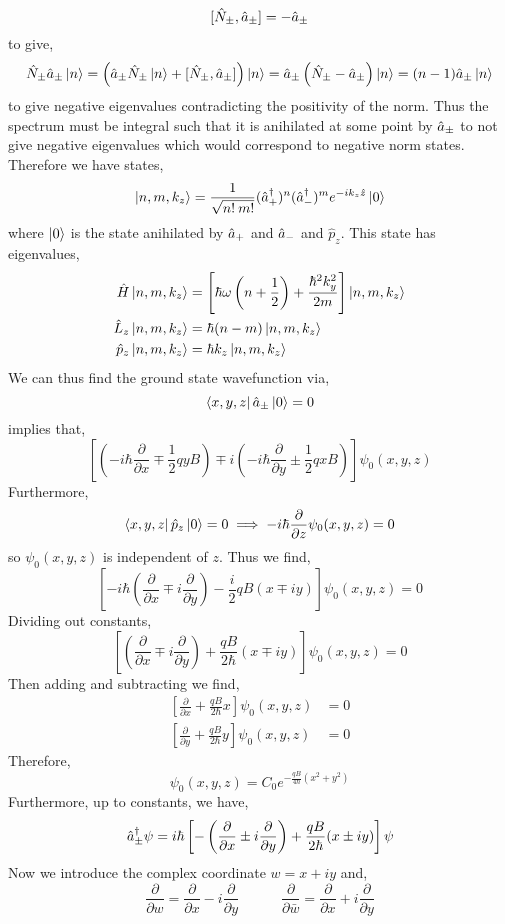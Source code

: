 \documentclass[12pt]{extarticle}
\newcommand{\pderiv}[2]{\frac{\partial{#1}}{\partial{#2}}}
\theoremstyle{definition}
\begin{document}
\[ [\hat{N}_{\pm}, \hat{a}_{\pm}] = - \hat{a}_{\pm} \]
to give,
\[ \hat{N}_{\pm} \hat{a}_{\pm} \left| n \right> = \left( \hat{a}_{\pm} \hat{N}_{\pm} \left| n \right> + [\hat{N}_{\pm}, \hat{a}_{\pm}] \right) \left| n \right> = \hat{a}_{\pm} \left( \hat{N}_{\pm}  - \hat{a}_{\pm} \right) \left| n \right> = (n - 1) \hat{a}_{\pm} \left| n \right> \]
to give negative eigenvalues contradicting the positivity of the norm. Thus the spectrum must be integral such that it is anihilated at some point by $\hat{a}_{\pm}$ to not give negative eigenvalues which would correspond to negative norm states. Therefore we have states,
\[ \left| n, m, k_z \right> = \frac{1}{\sqrt{n! \: m!}} (\hat{a}^\dagger_{+})^n (\hat{a}^\dagger_{-})^m e^{- i k_z \hat{z}} \left| 0 \right> \]
where $\left| 0 \right>$ is the state anihilated by $\hat{a}_{+}$ and $\hat{a}_{-}$ and $\hat{p}_z$. This state has eigenvalues,
\begin{align*}
\hat{H} \left| n, m, k_z \right> & = \left[ \hbar \omega \left( n + \frac{1}{2} \right) + \frac{\hbar^2 k_y^2}{2m} \right] \left| n, m, k_z \right>
\\
\hat{L}_z \left| n, m, k_z \right> & = \hbar (n - m) \left| n, m, k_z \right>
\\
\hat{p}_z \left| n, m, k_z \right> & = \hbar k_z \left| n, m, k_z \right>
\end{align*}
We can thus find the ground state wavefunction via,
\[ \left< x,y,z \right| \hat{a}_{\pm} \left| 0 \right> = 0 \]
implies that,
\[ \left[ \left( - i \hbar \pderiv{}{x} \mp \frac{1}{2} q y B \right) \mp i \left( - i \hbar \pderiv{}{y} \pm \frac{1}{2} q x B \right) \right] \psi_0(x, y, z) \]
Furthermore,
\[ \bra{x,y,z} \hat{p}_z \ket{0} = 0 \implies - i \hbar \pderiv{}{z} \psi_0(x,y,z) = 0 \]
so $\psi_0(x, y, z)$ is independent of $z$. Thus we find,
\[ \left[ - i \hbar \left( \pderiv{}{x} \mp i \pderiv{}{y} \right) - \frac{i}{2} q B ( x \mp i y ) \right] \psi_0(x, y, z) = 0 \]
Dividing out constants,
\[ \left[ \left( \pderiv{}{x} \mp i \pderiv{}{y} \right) + \frac{q B}{2 \hbar} ( x \mp i y ) \right] \psi_0(x, y, z) = 0 \]
Then adding and subtracting we find,
\begin{align*}
\left[  \pderiv{}{x} + \frac{q B}{2 \hbar} x \right] \psi_0(x, y, z) & = 0
\\
\left[ \pderiv{}{y} + \frac{q B}{2 \hbar} y \right] \psi_0(x, y, z) & = 0
\end{align*}
Therefore,
\[ \psi_0(x, y, z) = C_0 e^{- \frac{q B}{4 \hbar} (x^2 + y^2) } \]
Furthermore, up to constants, we have,
\[ \adag_{\pm} \psi = i \hbar \left[ - \left( \pderiv{}{x} \pm i \pderiv{}{y} \right) + \frac{q B}{2 \hbar} ( x \pm i y ) \right] \psi \]
Now we introduce the complex coordinate $w = x + i y$ and,
\[ \pderiv{}{w} = \pderiv{}{x} - i \pderiv{}{y} \quad \quad \quad \pderiv{}{\bar{w}} = \pderiv{}{x} + i \pderiv{}{y} \]
\end{document}
